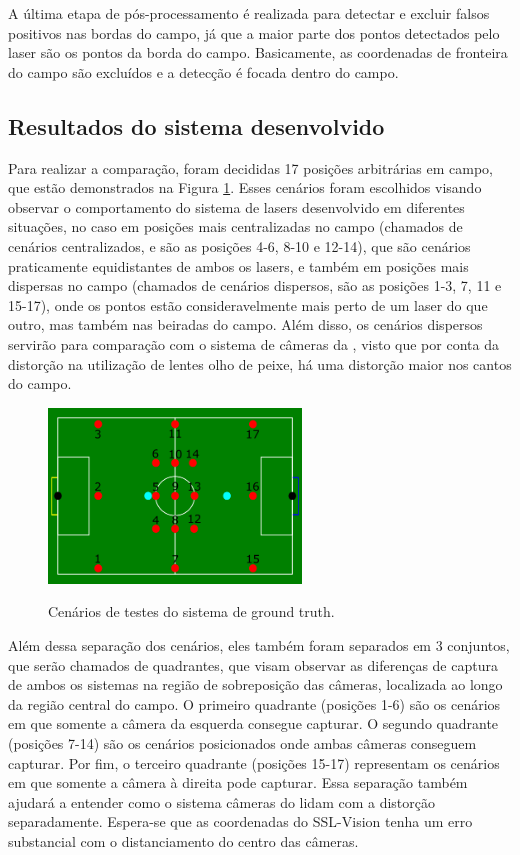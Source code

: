 \documentclass[acronym, symbols, table]{fei}
\begin{document}
				A última etapa de pós-processamento é realizada para detectar e excluir falsos positivos nas bordas do campo, já que a maior parte dos pontos detectados pelo laser são os pontos da borda do campo. Basicamente, as coordenadas de fronteira do campo são excluídos e a detecção é focada dentro do campo.
		
			\subsection{Resultados do sistema desenvolvido}
		
				Para realizar a comparação, foram decididas 17 posições arbitrárias em campo, que estão demonstrados na Figura \ref{fig:cenarios_testes_ground_truth}. Esses cenários foram escolhidos visando observar o comportamento do sistema de lasers desenvolvido em diferentes situações, no caso em posições mais centralizadas no campo (chamados de cenários centralizados, e são as posições 4-6, 8-10 e 12-14), que são cenários praticamente equidistantes de ambos os lasers, e também em posições mais dispersas no campo (chamados de cenários dispersos, são as posições 1-3, 7, 11 e 15-17), onde os pontos estão consideravelmente mais perto de um laser do que outro, mas também nas beiradas do campo. Além disso, os cenários dispersos servirão para comparação com o sistema de câmeras da , visto que por conta da distorção na utilização de lentes olho de peixe, há uma distorção maior nos cantos do campo.
				
				\begin{figure}[!htb]
					\centering
					\caption{Cenários de testes do sistema de ground truth.}
					\includegraphics[width=0.6\textwidth]{cenarios_testes.png}
					\label{fig:cenarios_testes_ground_truth}
				\end{figure}
			
				Além dessa separação dos cenários, eles também foram separados em 3 conjuntos, que serão chamados de quadrantes, que visam observar as diferenças de captura de ambos os sistemas na região de sobreposição das câmeras, localizada ao longo da região central do campo. O primeiro quadrante (posições 1-6) são os cenários em que somente a câmera da esquerda consegue capturar. O segundo quadrante (posições 7-14) são os cenários posicionados onde ambas câmeras conseguem capturar. Por fim, o terceiro quadrante (posições 15-17) representam os cenários em que somente a câmera à direita pode capturar. Essa separação também ajudará a entender como o sistema câmeras do  lidam com a distorção separadamente. Espera-se que as coordenadas do SSL-Vision tenha um erro substancial com o distanciamento do centro das câmeras.
				
\end{document}
